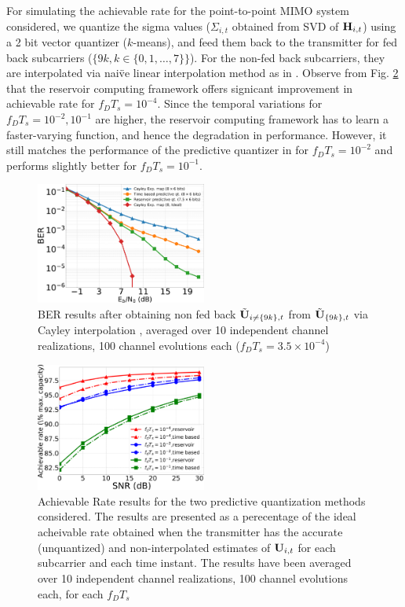 \documentclass[conference]{IEEEtran}
\begin{document}
For simulating the achievable rate for the point-to-point MIMO system considered, we quantize the sigma values ($\Sigma_{i,t}$ obtained from SVD of ${\bf H}_{i,t}$) using a 2 bit vector quantizer ($k$-means), and feed them back to the transmitter for fed back subcarriers ($\{9k, k \in \{0,1,\ldots,7\}\}$). For the non-fed back subcarriers, they are interpolated via nai\"ve linear interpolation method as in \cite{Gupt1905:Predictive}. Observe from Fig. \ref{achievrate} that the reservoir computing framework offers signicant improvement in achievable rate for $f_DT_s=10^{-4}$. Since the temporal variations for $f_DT_s=10^{-2}, 10^{-1}$ are higher, the reservoir computing framework has to learn a faster-varying function, and hence the degradation in performance. However, it still matches the performance of the predictive quantizer in \cite{6891198} for $f_DT_s=10^{-2}$ and performs slightly better for $f_DT_s=10^{-1}$.
\begin{figure}[h]
\centering
\includegraphics[width=0.5\textwidth]{images/BER_res.pdf}
\caption{BER results after obtaining non fed back $\tilde{{\bf U}}_{i\neq\{9k\},t}$ from $\tilde{{\bf U}}_{\{9k\},t}$ via Cayley interpolation \cite{Gupt1905:Predictive}, averaged over 10 independent channel realizations, 100 channel evolutions each ($f_DT_s=3.5\times10^{-4}$)}
\label{BER}
\end{figure}

\begin{figure}[h]
\centering
\includegraphics[width=0.5\textwidth]{images/achievRate.pdf}
\caption{Achievable Rate results for the two predictive quantization methods considered. The results are presented as a perecentage of the ideal acheivable rate obtained when the transmitter has the accurate (unquantized) and non-interpolated estimates of ${\bf U}_{i,t}$ for each subcarrier and each time instant. The results have been averaged over 10 independent channel realizations, 100 channel evolutions each, for each $f_DT_s$}
\label{achievrate}
\end{figure}
\end{document}
